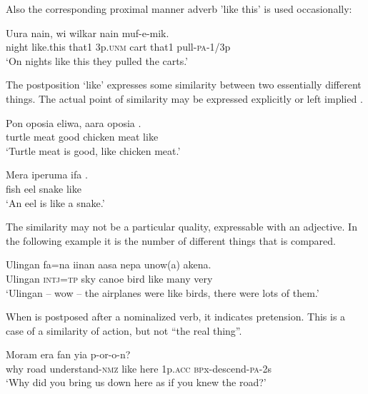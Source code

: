 Also the corresponding proximal manner adverb  'like this' is used occasionally:

\ea%
\label{ex:6:x1347}
\gll Uura    nain,  wi  wilkar  nain  muf-e-mik. \\
night  like.this  that1  3p.\textsc{unm}  cart  that1  pull-\textsc{pa}-1/3p\\
\glt `On nights like this they pulled the carts.'
\z

The postposition  `like' expresses some similarity between two essentially different things. The actual point of similarity may be expressed explicitly  or left implied .

\ea%
\label{ex:6:x1341}
\gll Pon  oposia  eliwa,  aara  oposia  . \\
turtle  meat  good  chicken  meat  like\\
\glt `Turtle meat is good, like chicken meat.'
\z

\ea%
\label{ex:6:x1340}
\gll Mera  iperuma  ifa  . \\
fish  eel  snake  like\\
\glt `An eel is like a snake.'
\z

The similarity may not be a particular quality, expressable with an adjective. In the following example it is the number of different things that is compared.

\ea%
\label{ex:6:x1342}
\gll Ulingan  fa=na  iinan  aasa  nepa    unow(a)  akena. \\
Ulingan  \textsc{intj}=\textsc{tp}  sky  canoe  bird  like  many  very\\
\glt `Ulingan -- wow -- the airplanes were like birds, there were lots of them.'
\z

When  is postposed after a nominalized verb, it indicates pretension. This is a case of a similarity of action, but not ``the real thing''.

\ea%
\label{ex:6:x1343}
\gll Moram  era      fan  yia p-or-o-n?\\
why  road  understand-\textsc{nmz}  like  here  1p.\textsc{acc} \textsc{bp}x-descend-\textsc{pa}-2s\\
\glt `Why did you bring us down here as if you knew the road?'
\z

